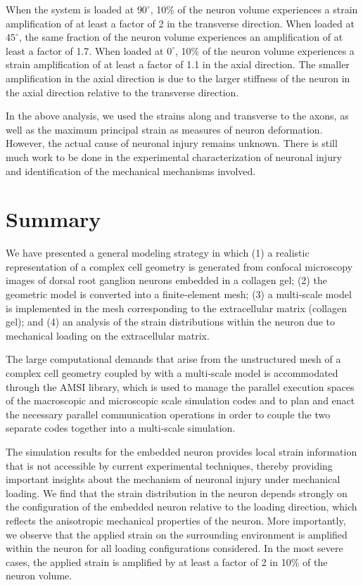 \documentclass[]{interact}
\begin{document}
When the system is loaded at $90^{\circ}$, 10$\%$ of the neuron volume experiences a strain amplification of at least a factor of 2 in the transverse direction. When loaded at $45^{\circ}$, the same fraction of the neuron volume experiences an amplification of at least a factor of 1.7. When loaded at $0^{\circ}$, 10$\%$ of the neuron volume experiences a strain amplification of at least a factor of 1.1 in the axial direction. The smaller amplification in the axial direction is due to the larger stiffness of the neuron in the axial direction relative to the transverse direction. 

In the above analysis, we used the strains along and transverse to the axons, as well as the maximum principal strain as measures of neuron deformation. However, the actual cause of neuronal injury remains unknown. There is still much work to be done in the experimental characterization of neuronal injury and identification of the mechanical mechanisms involved.
\section{Summary}
\label{sec:summary}

We have presented a general modeling strategy in which (1) a realistic representation of a complex cell geometry is generated from confocal microscopy images of dorsal root ganglion neurons embedded in a collagen gel; (2) the geometric model is converted into a finite-element mesh; (3) a multi-scale model is implemented in the mesh corresponding to the extracellular matrix (collagen gel); and (4) an analysis of the strain distributions within the neuron due to mechanical loading on the extracellular matrix.

The large computational demands that arise from the unstructured mesh of a complex cell geometry coupled by with a multi-scale model is accommodated through the AMSI library, which is used to manage the parallel execution spaces of the macroscopic and microscopic scale simulation codes and to plan and enact the necessary parallel communication operations in order to couple the two separate codes together into a multi-scale simulation.

The simulation results for the embedded neuron provides local strain information that is not accessible by current experimental techniques, thereby providing important insights about the mechanism of neuronal injury under mechanical loading. We find that the strain distribution in the neuron depends strongly on the configuration of the embedded neuron relative to the loading direction, which reflects the anisotropic mechanical properties of the neuron. More importantly, we observe that the applied strain on the surrounding environment is amplified within the neuron for all loading configurations considered. In the most severe cases, the applied strain is amplified by at least a factor of 2 in 10$\%$ of the neuron volume. 
\end{document}
